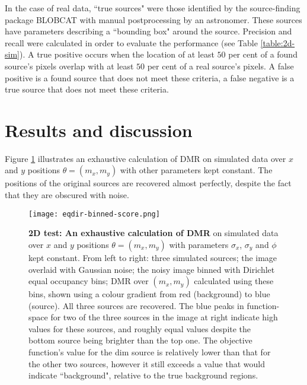 \documentclass[
    ,final            %
  ]
  {aipproc}
\begin{document}
In the case of real data, ``true sources" were those identified by the source-finding package BLOBCAT \cite{hales2012blobcat} with manual postprocessing by an astronomer. These sources have parameters describing a ``bounding box" around the source. Precision and recall \cite{olson2008advanced} were calculated in order to evaluate the performance (see Table \ref{table:2d-sim}). %
A true positive occurs when the location of at least $50$ per cent of a found source's pixels overlap with at least $50$ per cent of a real source's pixels. A false positive is a found source that does not meet these criteria, a false negative is a true source that does not meet these criteria. 

\section{Results and discussion}\label{sec:results}
Figure \ref{fig:eqdir-binned-score} illustrates an exhaustive calculation of DMR on simulated data over $x$ and $y$ positions $\theta = (m_x, m_y)$ with other parameters kept constant. The positions of the original sources are recovered almost perfectly, despite the fact that they are obscured with noise.

\begin{figure}[hbt]
\centering
\texttt{[image: eqdir-binned-score.png]} 
\caption{\textbf{2D test: An exhaustive calculation of DMR} on simulated data over $x$ and $y$ positions $\theta = (m_x, m_y)$ with parameters $\sigma_x$,  $\sigma_y$ and $\phi$ kept constant. From left to right: three simulated sources; the image overlaid with Gaussian noise; the noisy image binned with Dirichlet equal occupancy bins; DMR over $(m_x,m_y)$ calculated using these bins, shown using a colour gradient from red (background) to blue (source). All three sources are recovered. The blue peaks in function-space for two of the three sources in the image at right indicate high values for these sources, and roughly equal values despite the bottom source being brighter than the top one. The objective function's value for the dim source is relatively lower than that for the other two sources, however it still exceeds a value that would indicate ``background", relative to the true background regions.} 
\label{fig:eqdir-binned-score}
\end{figure}
\end{document}
